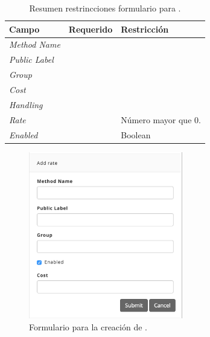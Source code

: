 \begin{table}[H]
    \centering
	\begin{tabular}{ |l|c||l| }
		\hline Campo & Requerido & Restricción \\ \hline
		\multirow{1}{*}{\textit{Method Name}} 	&  \checkmark 	& \\ \hline
		\multirow{1}{*}{\textit{Public Label}} 	&  \checkmark	& \\ \hline
		\multirow{1}{*}{\textit{Group}} 		&  \checkmark	& \\ \hline
		\multirow{1}{*}{\textit{Cost}} 			&  				& \\ \hline
		\multirow{1}{*}{\textit{Handling}} 		&  				& \\ \hline
		\multirow{1}{*}{\textit{Rate}} 			&  \checkmark	& Número mayor que 0. \\ \hline
		\multirow{1}{*}{\textit{Enabled}} 		&  \checkmark	& Boolean \\ \hline
	\end{tabular}
 	\caption{Resumen restrincciones formulario para \shippingEF.}
    \label{tab:dashboard:shipping:form:restrictions:shipping}
\end{table}

\begin{figure}[H]
	\centering
	\includegraphics[width=0.6\textwidth]{figuras/dashboard/shipping/form_shipping_add.png}
	\caption{Formulario para la creación de \shippingEF.}
	\label{figure:dashboard:shipping:form_shipping_add}
\end{figure}



